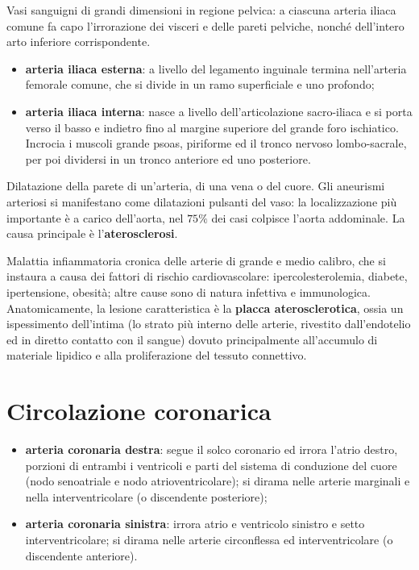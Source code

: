 Vasi sanguigni di grandi dimensioni in regione pelvica: a ciascuna arteria iliaca comune fa capo
l'irrorazione dei visceri e delle pareti pelviche, nonché dell'intero arto inferiore
corrispondente.

\begin{itemize}
  \item \textbf{arteria iliaca esterna}: a livello del legamento inguinale termina nell'arteria
    femorale comune, che si divide in un ramo superficiale e uno profondo;
  \item \textbf{arteria iliaca interna}: nasce a livello dell'articolazione sacro-iliaca e si porta
    verso il basso e indietro fino al margine superiore del grande foro ischiatico. Incrocia i
    muscoli grande psoas, piriforme ed il tronco nervoso lombo-sacrale, per poi dividersi in un
    tronco anteriore ed uno posteriore.
\end{itemize}

Dilatazione della parete di un'arteria, di una vena o del cuore. Gli aneurismi arteriosi si
manifestano come dilatazioni pulsanti del vaso: la localizzazione più importante è a carico
dell'aorta, nel $75\%$ dei casi colpisce l'aorta addominale. La causa principale è
l'\textbf{aterosclerosi}.

Malattia infiammatoria cronica delle arterie di grande e medio calibro, che si instaura a causa
dei fattori di rischio cardiovascolare: ipercolesterolemia, diabete, ipertensione, obesità; altre
cause sono di natura infettiva e immunologica. Anatomicamente, la lesione caratteristica è la
\textbf{placca aterosclerotica}, ossia un ispessimento dell'intima (lo strato più interno delle
arterie, rivestito dall'endotelio ed in diretto contatto con il sangue) dovuto principalmente
all'accumulo di materiale lipidico e alla proliferazione del tessuto connettivo.

\section{Circolazione coronarica}

\begin{itemize}
  \item \textbf{arteria coronaria destra}: segue il solco coronario ed irrora l'atrio destro,
    porzioni di entrambi i ventricoli e parti del sistema di conduzione del cuore (nodo
    senoatriale e nodo atrioventricolare); si dirama nelle arterie marginali e nella
    interventricolare (o discendente posteriore);
  \item \textbf{arteria coronaria sinistra}: irrora atrio e ventricolo sinistro e setto
    interventricolare; si dirama nelle arterie circonflessa ed interventricolare (o discendente
    anteriore).
\end{itemize}

